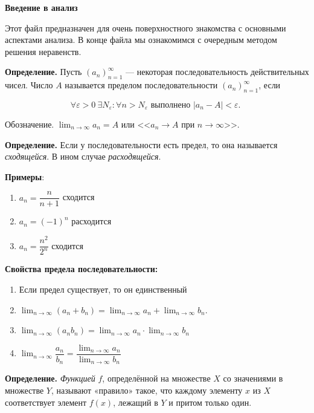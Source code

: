 \centerline{\bf \Huge Введение в анализ}


Этот файл предназначен для очень поверхностного знакомства с основными аспектами анализа. В конце файла мы ознакомимся с очередным методом решения неравенств.

\textbf{Определение.} Пусть $\left(a_n\right)_{n=1}^{\infty}$ --- некоторая последовательность действительных чисел. Число $A$ называется пределом последовательности $\left(a_n\right)_{n=1}^{\infty}$, если

$$
\forall \varepsilon>0 \ \exists N_{\varepsilon}: \forall n>N_{\varepsilon} \text { выполнено }\left|a_n-A\right|<\varepsilon \text {. }
$$


Обозначение. $\lim _{n \rightarrow \infty} a_n=A$ или <<$a_n \rightarrow A$ при $n \rightarrow \infty$>>.

\textbf{Определение.}
Если у последовательности есть предел, то она называется \textit{сходящейся}. В ином случае \textit{расходящейся}.

\textbf{Примеры}:

\begin{enumerate}
    \item $a_n = \dfrac{n}{n+1}$ сходится
    \item $a_n = (-1)^n$ расходится
    \item $a_n = \dfrac{n^2}{2^n}$ сходится
\end{enumerate}

\textbf{Свойства предела последовательности:}

\begin{enumerate}
    \item Если предел существует, то он единственный
    \item $\lim _{n \rightarrow \infty}\left(a_n+b_n\right)=\lim _{n \rightarrow \infty} a_n+\lim _{n \rightarrow \infty} b_n$.
    \item $\lim _{n \rightarrow \infty}\left(a_n b_n\right)=\lim _{n \rightarrow \infty} a_n \cdot \lim _{n \rightarrow \infty} b_n$
    \item $\lim _{n \rightarrow \infty} \dfrac{a_n}{b_n}=\dfrac{\lim _{n \rightarrow \infty} a_n}{\lim _{n \rightarrow \infty} b_n}$
\end{enumerate}

\textbf{Определение.} \textit{Функцией} $f$, определённой на множестве $X$ со значениями в множестве $Y$, называют «правило» такое, что каждому элементу $x$ из $X$ соответствует элемент $f(x)$, лежащий в $Y$ и притом только один.

